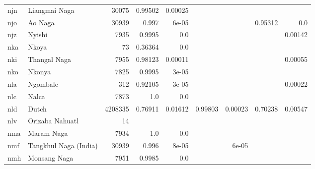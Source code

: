 \documentclass[11pt]{article}
\begin{document}
\begin{table*}[h]
{\begin{tabular}{llrrrrrrr}
njn         & Liangmai Naga         & 30075         & 0.99502         & 0.00025         &          &          &          &          \\

njo         & Ao Naga         & 30939         & 0.997         & 6e-05         &          &          & 0.95312         & 0.0         \\

njz         & Nyishi         & 7935         & 0.9995         & 0.0         &          &          &          & 0.00142         \\

nka         & Nkoya         & 73         & 0.36364         & 0.0         &          &          &          &          \\

nki         & Thangal Naga         & 7955         & 0.98123         & 0.00011         &          &          &          & 0.00055         \\

nko         & Nkonya         & 7825         & 0.9995         & 3e-05         &          &          &          &          \\

nla         & Ngombale         & 312         & 0.92105         & 3e-05         &          &          &          & 0.00022         \\

nlc         & Nalca         & 7873         & 1.0         & 0.0         &          &          &          &          \\

nld         & Dutch         & 4208335         & 0.76911         & 0.01612         & 0.99803         & 0.00023         & 0.70238         & 0.00547         \\

nlv         & Orizaba Nahuatl         & 14         &          &          &          &          &          &          \\

nma         & Maram Naga         & 7934         & 1.0         & 0.0         &          &          &          &          \\

nmf         & Tangkhul Naga (India)         & 30939         & 0.996         & 8e-05         &          & 6e-05         &          &          \\

nmh         & Monsang Naga         & 7951         & 0.9985         & 0.0         &          &          &          &          \\


\end{tabular}}
\end{table*}
\end{document}
